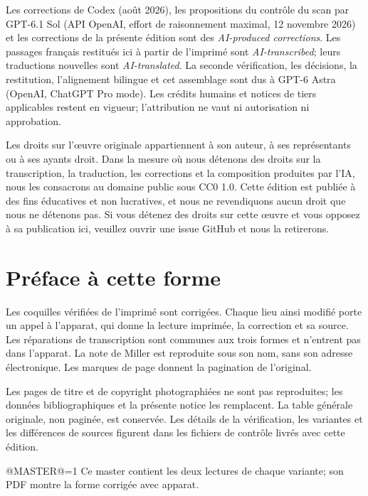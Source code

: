 \documentclass[oneside]{book}
\makeatletter
\theoremstyle{sga-source}
\theoremstyle{sga-source-dash}
\theoremstyle{sga-source-dotdash}
\theoremstyle{sga-source-number-note-dash}
\theoremstyle{sga-source-note-number-dotdash}
\theoremstyle{sga-source-example-dotdash}
\theoremstyle{sga-source-inline-number}
\theoremstyle{sga-source-bare-number}
\theoremstyle{sga-source}
\providecommand\EditionIsMaster{@MASTER@}
\makeatother
\begin{document}
\medskip
Les corrections de Codex (août 2026), les propositions du contrôle du scan
par GPT-6.1 Sol (API OpenAI, effort de raisonnement maximal, 12 novembre
2026) et les corrections de la présente édition sont des
\emph{AI-produced corrections}. Les passages français restitués ici à
partir de l’imprimé sont \emph{AI-transcribed}; leurs traductions nouvelles
sont \emph{AI-translated}. La seconde vérification, les décisions, la
restitution, l’alignement bilingue et cet assemblage sont dus à GPT-6 Astra
(OpenAI, ChatGPT Pro mode). Les crédits humains et notices de tiers
applicables restent en vigueur; l’attribution ne vaut ni autorisation ni
approbation.

\medskip
Les droits sur l'œuvre originale appartiennent à son auteur, à ses représentants ou à ses ayants
droit. Dans la mesure où nous détenons des droits sur la transcription, la traduction, les corrections et la
composition produites par l'IA, nous les consacrons au domaine public sous CC0 1.0. Cette édition est publiée
à des fins éducatives et non lucratives, et nous ne revendiquons aucun droit que nous ne détenons pas. Si vous
détenez des droits sur cette œuvre et vous opposez à sa publication ici, veuillez ouvrir une issue GitHub et
nous la retirerons.

\chapter*{Préface à cette forme}
Les coquilles vérifiées de l’imprimé sont corrigées. Chaque lieu
ainsi modifié porte un appel à l’apparat, qui donne la lecture imprimée,
la correction et sa source. Les réparations de transcription sont communes
aux trois formes et n’entrent pas dans l’apparat. La note de Miller est
reproduite sous son nom, sans son adresse électronique. Les marques de
page donnent la pagination de l’original.

Les pages de titre et de copyright photographiées ne sont pas reproduites;
les données bibliographiques et la présente notice les remplacent. La
table générale originale, non paginée, est conservée. Les détails de la
vérification, les variantes et les différences de sources figurent dans
les fichiers de contrôle livrés avec cette édition.

\ifnum\EditionIsMaster=1\relax
Ce master contient les deux lectures de chaque variante; son PDF montre la forme corrigée avec apparat.
\fi

\clearpage

\or
\end{document}
